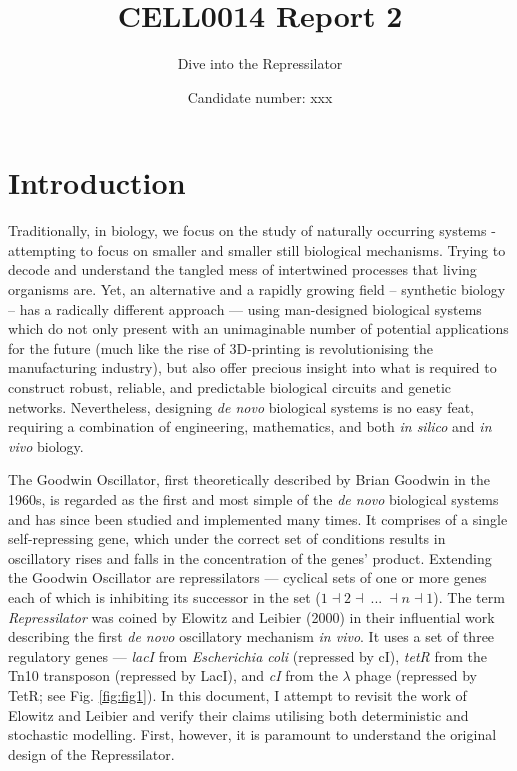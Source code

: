 \documentclass[runningheads,a4paper]{llncs}
\title{\textbf{CELL0014 Report 2}}
\subtitle{Dive into the Repressilator}
\author{\large{Candidate number: xxx}} %
\institute{\large{University College London}}
\begin{document}
%
\maketitle%

\bigskip
\bigskip
\onehalfspacing
%
\section*{Introduction}
Traditionally, in biology, we focus on the study of naturally occurring systems - attempting to focus on smaller and smaller still biological mechanisms. Trying to decode and understand the tangled mess of intertwined processes that living organisms are. Yet, an alternative and a rapidly growing field -- synthetic biology -- has a radically different approach --- using man-designed biological systems which do not only present with an unimaginable number of potential applications for the future (much like the rise of 3D-printing is revolutionising the manufacturing industry), but also offer precious insight into what is required to construct robust, reliable, and predictable biological circuits and genetic networks. Nevertheless, designing \textit{de novo} biological systems is no easy feat, requiring a combination of engineering, mathematics, and both \textit{in silico} and \textit{in vivo} biology.

The Goodwin Oscillator, first theoretically described by Brian Goodwin in the 1960s, is regarded as the first and most simple of the \textit{de novo} biological systems and has since been studied and implemented many times\cite{Gonze2013a, Purcell2010a}. It comprises of a single self-repressing gene, which under the correct set of conditions results in oscillatory rises and falls in the concentration of the genes' product. Extending the Goodwin Oscillator are repressilators --- cyclical sets of one or more genes each of which is inhibiting its successor in the set ($1 \dashv 2 \dashv\ ...\ \dashv n \dashv 1$)\cite{Muller2006, Purcell2010a}. The term \textit{Repressilator} was coined by Elowitz and Leibier (2000)\cite{Elowitz2000d} in their influential work describing the first \textit{de novo} oscillatory mechanism \textit{in vivo}. It uses a set of three regulatory genes --- \textit{lacI} from \textit{Escherichia coli} (repressed by cI), \textit{tetR} from the Tn10 transposon (repressed by LacI), and \textit{cI} from the $\lambda$ phage (repressed by TetR; see Fig. \ref{fig:fig1})\cite{Elowitz2000d}. In this document, I attempt to revisit the work of Elowitz and Leibier and verify their claims utilising both deterministic and stochastic modelling. First, however, it is paramount to understand the original design of the Repressilator.
\end{document}
